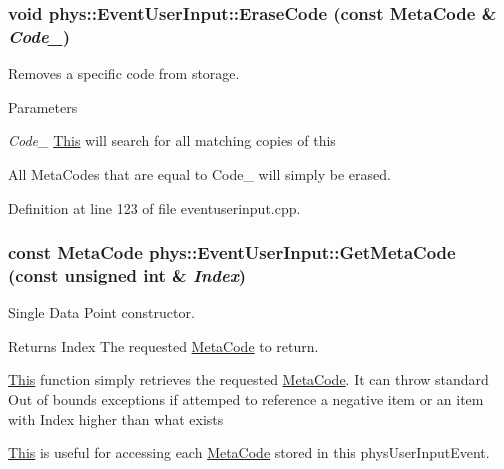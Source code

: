 \hypertarget{classphys_1_1EventUserInput_a34c05a76a790435799441da75a83fa9c}{
\subsubsection[{EraseCode}]{\setlength{\rightskip}{0pt plus 5cm}void phys::EventUserInput::EraseCode (const {\bf MetaCode} \& {\em Code\_\-})}}
\label{d7/df5/classphys_1_1EventUserInput_a34c05a76a790435799441da75a83fa9c}


Removes a specific code from storage. 


\begin{DoxyParams}{Parameters}
\item[{\em Code\_\-}]\hyperlink{structThis}{This} will search for all matching copies of this\end{DoxyParams}
All MetaCodes that are equal to Code\_\- will simply be erased. 

Definition at line 123 of file eventuserinput.cpp.

\hypertarget{classphys_1_1EventUserInput_aaf56168b98e339cec74ae862b64632ba}{
\subsubsection[{GetMetaCode}]{\setlength{\rightskip}{0pt plus 5cm}const {\bf MetaCode} phys::EventUserInput::GetMetaCode (const unsigned int \& {\em Index})}}
\label{d7/df5/classphys_1_1EventUserInput_aaf56168b98e339cec74ae862b64632ba}


Single Data Point constructor. 

\begin{DoxyReturn}{Returns}
Index The requested \hyperlink{classphys_1_1MetaCode}{MetaCode} to return.
\end{DoxyReturn}
\hyperlink{structThis}{This} function simply retrieves the requested \hyperlink{classphys_1_1MetaCode}{MetaCode}. It can throw standard Out of bounds exceptions if attemped to reference a negative item or an item with Index higher than what exists \par
 \hyperlink{structThis}{This} is useful for accessing each \hyperlink{classphys_1_1MetaCode}{MetaCode} stored in this physUserInputEvent. 

